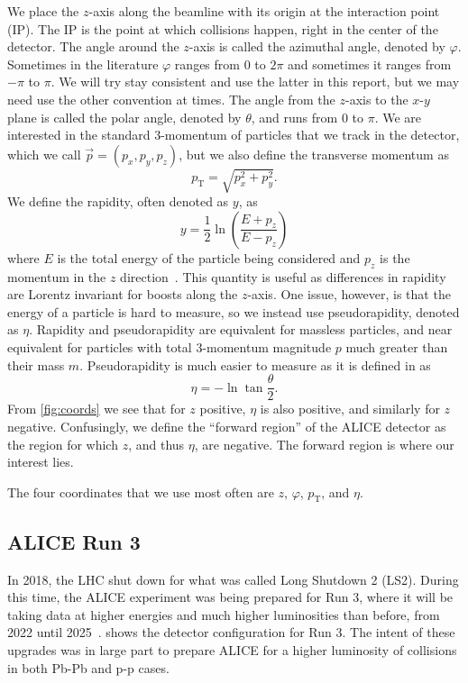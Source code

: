 We place the $z$-axis along the beamline with its origin at the interaction point (IP). The IP is the point at which collisions happen, right in the center of the detector. The angle around the $z$-axis is called the azimuthal angle, denoted by $\varphi$. Sometimes in the literature $\varphi$ ranges from 0 to $2\pi$ and sometimes it ranges from $-\pi$ to $\pi$. We will try stay consistent and use the latter in this report, but we may need use the other convention at times. The angle from the $z$-axis to the $x$-$y$ plane is called the polar angle, denoted by $\theta$, and runs from 0 to $\pi$. We are interested in the standard 3-momentum of particles that we track in the detector, which we call $\vec{p}=(p_x,p_y,p_z)$, but we also define the transverse momentum as 
\begin{equation}
    p_{\mathrm{T}}=\sqrt{p_x^2 + p_y^2}.
    \label{eqn:transverse momentum}
\end{equation}
We define the rapidity, often denoted as $y$, as
\begin{equation}
    y=\frac 12 \ln\left(\frac{E+p_z}{E-p_z}\right)
    \label{eqn:rapidity}
\end{equation}
where $E$ is the total energy of the particle being considered and $p_z$ is the momentum in the $z$ direction~\cite{kar_exp_phys}. This quantity is useful as differences in rapidity are Lorentz invariant for boosts along the $z$-axis. One issue, however, is that the energy of a particle is hard to measure, so we instead use pseudorapidity, denoted as $\eta$. Rapidity and pseudorapidity are equivalent for massless particles, and near equivalent for particles with total 3-momentum magnitude $p$ much greater than their mass $m$. Pseudorapidity is much easier to measure as it is defined in \cite{kar_exp_phys} as
\begin{equation}
    \eta=-\ln\tan\frac{\theta}{2}.
    \label{eqn:pseudorapidity}
\end{equation}
From \cref{fig:coords} we see that for $z$ positive, $\eta$ is also positive, and similarly for $z$ negative. Confusingly, we define the ``forward region'' of the ALICE detector as the region for which $z$, and thus $\eta$, are negative. The forward region is where our interest lies.

The four coordinates that we use most often are $z$, $\varphi$, $p_\mathrm{T}$, and $\eta$. 

\subsection{ALICE Run 3}
In 2018, the LHC shut down for what was called Long Shutdown 2 (LS2). During this time, the ALICE experiment was being prepared for Run 3, where it will be taking data at higher energies and much higher luminosities than before, from 2022 until 2025~\cite{ALICE_Upgrade_LOI}.  shows the detector configuration for Run 3. The intent of these upgrades was in large part to prepare ALICE for a higher luminosity of collisions in both Pb-Pb and p-p cases. 

